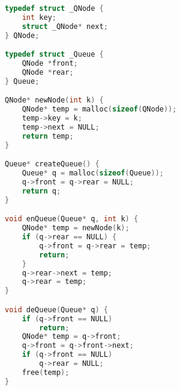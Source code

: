 \documentclass[11pt,a4paper]{article}
\begin{document}
\begin{lstlisting}[language=C]
typedef struct _QNode {
    int key;
    struct _QNode* next;
} QNode;

typedef struct _Queue {
    QNode *front;
    QNode *rear;
} Queue;

QNode* newNode(int k) {
    QNode* temp = malloc(sizeof(QNode));
    temp->key = k;
    temp->next = NULL;
    return temp;
}

Queue* createQueue() {
    Queue* q = malloc(sizeof(Queue));
    q->front = q->rear = NULL;
    return q;
}

void enQueue(Queue* q, int k) {
    QNode* temp = newNode(k);
    if (q->rear == NULL) {
        q->front = q->rear = temp;
        return;
    }
    q->rear->next = temp;
    q->rear = temp;
}

void deQueue(Queue* q) {
    if (q->front == NULL)
        return;
	QNode* temp = q->front;
	q->front = q->front->next;
	if (q->front == NULL)
		q->rear = NULL;
    free(temp);
}
\end{lstlisting}
\end{document}
